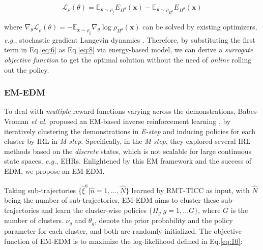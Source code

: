 \documentclass{article}
\begin{document}
\vspace{-0.2cm}
\begin{equation}
\label{eq:8}
    \mathcal{L}_{\rho}(\theta) = \mathbb{E}_{\mathbf{x} \sim \rho_{\xi}} E_{\Pi^{\theta}} (\mathbf{x}) - \mathbb{E}_{\mathbf{x} \sim \rho_{\Pi^{\theta}}} E_{\Pi^{\theta}} (\mathbf{x}) 
\end{equation}

\noindent where $\nabla_\theta \mathcal{L}_\rho (\theta) = - \mathbb{E}_{\mathbf{x} \sim \rho_{\xi}} \nabla_\theta \log \rho_{\Pi^{\theta}}(\mathbf{x})$ can be solved by existing optimizers, \textit{e.g.}, stochastic gradient Langevin dynamics \cite{welling2011bayesian}. Therefore, by substituting the first term in Eq.\eqref{eq:6} as Eq.\eqref{eq:8} via energy-based model, we can derive a \emph{surrogate objective function} to get the optimal solution without the need of \emph{online} rolling out the policy. 



\subsubsection{EM-EDM}

To deal with \emph{multiple} reward functions varying across the demonstrations, Babes-Vroman \textit{et al.} proposed an EM-based inverse reinforcement learning \cite{babes2011apprenticeship}, by iteratively clustering the demonstrations in \textit{E-step} and inducing policies for each cluster by IRL in \textit{M-step}. Specifically, in the \textit{M-step}, they explored several IRL methods based on the \emph{discrete} states, which is not scalable for large continuous state spaces, \textit{e.g.}, EHRs. 
Enlightened by this EM framework and the success of EDM, we propose an EM-EDM. 


Taking sub-trajectories $\{\hat{\xi}^{\hat{n}} | \hat{n}=1,...,\hat{N}\}$ learned by RMT-TICC as input, with $\hat{N}$ being the number of sub-trajectories, EM-EDM aims to cluster these sub-trajectories and learn the cluster-wise policies $\{\Pi_g|g=1,...G\}$, where $G$ is the number of clusters. $\nu_{g}$ and $\theta_{g}$, denote the prior probability and the policy parameter for each cluster, and both are randomly initialized.  
The objective function of EM-EDM is to maximize the log-likelihood defined in Eq.\eqref{eq:10}:
\end{document}
